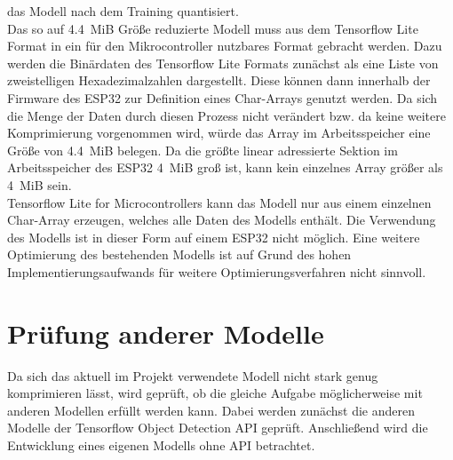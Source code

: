 das Modell nach dem Training quantisiert.\\ Das so auf \SI{4,4}{MiB} Größe reduzierte Modell muss aus dem Tensorflow Lite Format in ein für den Mikrocontroller nutzbares Format gebracht werden. Dazu werden die Binärdaten des Tensorflow Lite Formats zunächst als eine Liste von zweistelligen Hexadezimalzahlen dargestellt. Diese können dann innerhalb der Firmware des ESP32 zur Definition eines Char-Arrays genutzt werden. Da sich die Menge der Daten durch diesen Prozess nicht verändert bzw. da keine weitere Komprimierung vorgenommen wird, würde das Array im Arbeitsspeicher eine Größe von \SI{4,4}{MiB} belegen. Da die größte linear adressierte Sektion im Arbeitsspeicher des ESP32 \SI{4}{MiB} groß ist, kann kein einzelnes Array größer als \SI{4}{MiB} sein.\\ Tensorflow Lite for Microcontrollers kann das Modell nur aus einem einzelnen Char-Array erzeugen, welches alle Daten des Modells enthält. Die Verwendung des Modells ist in dieser Form auf einem ESP32 nicht möglich. Eine weitere Optimierung des bestehenden Modells ist auf Grund des hohen Implementierungsaufwands für weitere Optimierungsverfahren nicht sinnvoll.

\section{Prüfung anderer Modelle}
    Da sich das aktuell im Projekt verwendete Modell nicht stark genug komprimieren lässt, wird geprüft, ob die gleiche Aufgabe möglicherweise mit anderen Modellen erfüllt werden kann. Dabei werden zunächst die anderen Modelle der Tensorflow Object Detection API geprüft. Anschließend wird die Entwicklung eines eigenen Modells ohne API betrachtet.

